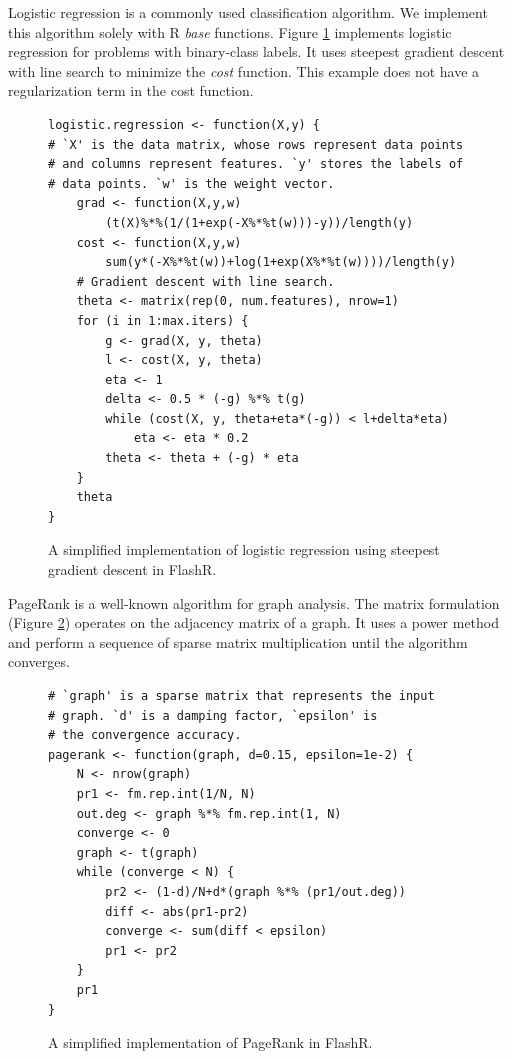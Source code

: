 Logistic regression is a commonly used classification algorithm.
We implement this algorithm solely with R \textit{base} functions. Figure
\ref{logistic} implements logistic regression for problems with binary-class
labels. It uses steepest gradient descent with line search to minimize
the \textit{cost} function. This example does not have a regularization term
in the cost function.
\begin{figure}
\begin{verbatim}
logistic.regression <- function(X,y) {
# `X' is the data matrix, whose rows represent data points
# and columns represent features. `y' stores the labels of
# data points. `w' is the weight vector.
	grad <- function(X,y,w)
		(t(X)%*%(1/(1+exp(-X%*%t(w)))-y))/length(y)
	cost <- function(X,y,w)
		sum(y*(-X%*%t(w))+log(1+exp(X%*%t(w))))/length(y)
	# Gradient descent with line search.
	theta <- matrix(rep(0, num.features), nrow=1)
	for (i in 1:max.iters) {
		g <- grad(X, y, theta)
		l <- cost(X, y, theta)
		eta <- 1
		delta <- 0.5 * (-g) %*% t(g)
		while (cost(X, y, theta+eta*(-g)) < l+delta*eta)
			eta <- eta * 0.2
		theta <- theta + (-g) * eta
	}
	theta
}
\end{verbatim}
\caption{A simplified implementation of logistic regression using
steepest gradient descent in FlashR.}
\label{logistic}
\end{figure}

PageRank is a well-known algorithm for graph analysis. The matrix formulation
(Figure \ref{pagerank}) operates on the adjacency matrix of a graph. It uses
a power method and perform a sequence of sparse matrix multiplication until
the algorithm converges.
\begin{figure}
\begin{verbatim}
# `graph' is a sparse matrix that represents the input
# graph. `d' is a damping factor, `epsilon' is
# the convergence accuracy.
pagerank <- function(graph, d=0.15, epsilon=1e-2) {
	N <- nrow(graph)
	pr1 <- fm.rep.int(1/N, N)
	out.deg <- graph %*% fm.rep.int(1, N)
	converge <- 0
	graph <- t(graph)
	while (converge < N) {
		pr2 <- (1-d)/N+d*(graph %*% (pr1/out.deg))
		diff <- abs(pr1-pr2)
		converge <- sum(diff < epsilon)
		pr1 <- pr2
	}
	pr1
}
\end{verbatim}
\caption{A simplified implementation of PageRank in FlashR.}
\label{pagerank}
\end{figure}
